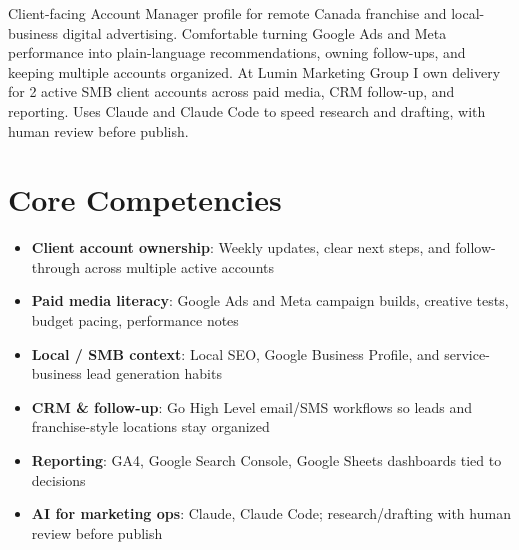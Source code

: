 \documentclass[11pt,a4paper,sans]{moderncv}
\begin{document}
\makecvtitle

\vspace{6pt}
\small{Client-facing Account Manager profile for remote Canada franchise and local-business digital advertising. Comfortable turning Google Ads and Meta performance into plain-language recommendations, owning follow-ups, and keeping multiple accounts organized. At Lumin Marketing Group I own delivery for 2 active SMB client accounts across paid media, CRM follow-up, and reporting. Uses Claude and Claude Code to speed research and drafting, with human review before publish.}

\section{Core Competencies}
\vspace{1pt}
\begin{itemize}
\item \textbf{Client account ownership}: Weekly updates, clear next steps, and follow-through across multiple active accounts
\item \textbf{Paid media literacy}: Google Ads and Meta campaign builds, creative tests, budget pacing, performance notes
\item \textbf{Local / SMB context}: Local SEO, Google Business Profile, and service-business lead generation habits
\item \textbf{CRM \& follow-up}: Go High Level email/SMS workflows so leads and franchise-style locations stay organized
\item \textbf{Reporting}: GA4, Google Search Console, Google Sheets dashboards tied to decisions
\item \textbf{AI for marketing ops}: Claude, Claude Code; research/drafting with human review before publish
\end{itemize}
\end{document}
